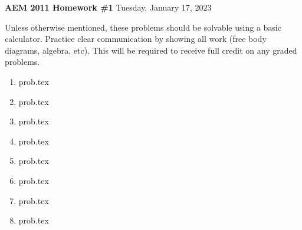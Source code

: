 \documentclass{article}
\begin{document}

\vspace{1cm}

\noindent
\textbf{AEM 2011 Homework \#1}
\hfill Tuesday, January 17, 2023

\vspace{.3cm}

Unless otherwise mentioned, these problems should be solvable using a basic calculator. Practice clear communication by showing all work (free body diagrams, algebra, etc).  This will be required to receive full credit on any graded problems.

\noindent
\begin{enumerate}
  \item {prob.tex} \newpage
  \item {prob.tex} \newpage
  \item {prob.tex} \newpage
  \item {prob.tex} \newpage
  \item {prob.tex} \newpage
  \item {prob.tex} \newpage
  \item {prob.tex} \newpage
  \item {prob.tex} \newpage
\end{enumerate}
\end{document}
